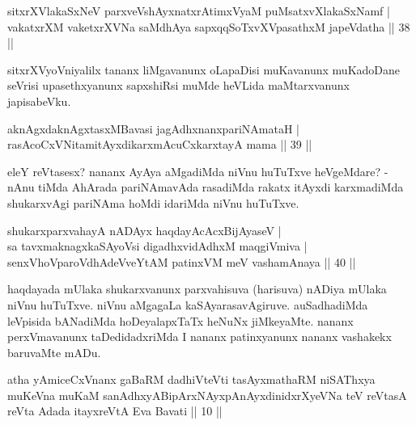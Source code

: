 
\begin{shl}
sitxrXVlakaSxNeV parxveVshAyxnatxrAtimxVyaM puMsatxvXlakaSxNamf | \\
vakatxrXM vaketxrXVNa saMdhAya sapxqqSoTxvXVpasathxM japeVdatha \hfill|| 38 || 
\end{shl}

\begin{artha}
sitxrXVyoVniyalilx tananx liMgavanunx oLapaDisi muKavanunx muKadoDane 
seVrisi upasethxyanunx sapxshiRsi muMde heVLida maMtarxvanunx 
japisabeVku.
\end{artha}


\begin{shl}
aknAgxdaknAgxtasxMBavasi jagAdhxnanxpariNAmataH | \\
rasAcoCxVNitamitAyxdikarxmAcuCxkarxtayA mama \hfill|| 39 || 
\end{shl}

\begin{artha}
eleY reVtasesx? nananx AyAya aMgadiMda niVnu huTuTxve heVgeMdare? - 
nAnu tiMda AhArada pariNAmavAda rasadiMda rakatx itAyxdi 
karxmadiMda shukarxvAgi pariNAma hoMdi idariMda niVnu huTuTxve.
\end{artha}


\begin{shl}
shukarxparxvahayA nADAyx haqdayAcAcxBijAyaseV | \\
sa tavxmaknagxkaSAyoV\s si digadhxvidAdhxM maqgiVmiva | \\
senxVhoVparoVdhAdeVveYtAM patinxVM meV vashamAnaya \hfill|| 40 || 
\end{shl}

\begin{artha}
haqdayada mUlaka shukarxvanunx parxvahisuva (harisuva) nADiya mUlaka 
niVnu huTuTxve. niVnu aMgagaLa kaSAyarasavAgiruve. auSadhadiMda 
leVpisida bANadiMda hoDeyalapxTaTx heNuNx jiMkeyaMte. nananx 
perxVmavanunx taDedidadxriMda I nananx patinxyanunx nananx vashakekx 
baruvaMte mADu.
\end{artha}

\begin{shl}
atha yAmiceCxVnanx gaBaRM dadhiVteVti tasAyxmathaRM niSAThxya muKeVna muKaM sanAdhxyABipArxNAyxpAnAyxdinidxrXyeVNa teV reVtasA reVta Adada itayxreVtA Eva Bavati || 10 ||
\end{shl}

